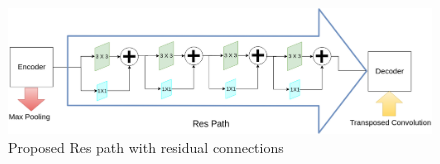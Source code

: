 \begin{figure}
    \centerline{\includegraphics[width=1\columnwidth]{04-methodology/figures/multiresunet-respath.jpg}}
    \caption{Proposed Res path with residual connections \cite{ibtehaz2020multiresunet}}
    \label{figure:multiresunet-respath}
\end{figure}